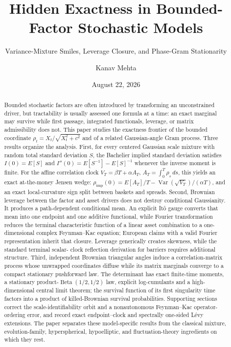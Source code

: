 \documentclass[
  english,
  11pt,
  letterpaper,
  DIV=11,
  numbers=noendperiod]{scrartcl}
\title{Hidden Exactness in Bounded-Factor Stochastic Models}
\subtitle{Variance-Mixture Smiles, Leverage Closure, and Phase-Gram
Stationarity}
\author{Kanav Mehta}
\date{August 22, 2026}
\theoremstyle{plain}
\theoremstyle{plain}
\theoremstyle{plain}
\theoremstyle{plain}
\theoremstyle{remark}
\begin{document}
\maketitle
\begin{abstract}
Bounded stochastic factors are often introduced by transforming an
unconstrained driver, but tractability is usually assessed one formula
at a time: an exact marginal may survive while first passage, integrated
functionals, leverage, or matrix admissibility does not. This paper
studies the exactness frontier of the bounded coordinate
\(\rho_t=X_t/\sqrt{X_t^2+c^2}\) and of a related Gaussian-angle Gram
process. Three results organize the analysis. First, for every centered
Gaussian scale mixture with random total standard deviation \(S\), the
Bachelier implied standard deviation satisfies \(I(0)=E[S]\) and
\(I''(0)=E[S^{-1}]-E[S]^{-1}\) whenever the inverse moment is finite.
For the affine correlation clock \(V_T=\beta T+\alpha A_T\),
\(A_T=\int_0^T\rho_s\,ds\), this yields an exact at-the-money Jensen
wedge: \(\rho_{\mathrm{imp}}(0)=E[A_T]/T-
\operatorname{Var}(\sqrt{V_T})/(\alpha T)\), and an exact
local-curvature sign split between baskets and spreads. Second, Brownian
leverage between the factor and asset drivers does not destroy
conditional Gaussianity. It produces a path-dependent conditional mean.
An explicit Itô gauge converts that mean into one endpoint and one
additive functional, while Fourier transformation reduces the terminal
characteristic function of a linear asset combination to a
one-dimensional complex Feynman--Kac equation; European claims with a
valid Fourier representation inherit that closure. Leverage generically
creates skewness, while the standard terminal scalar- clock reflection
derivation for barriers requires additional structure. Third,
independent Brownian triangular angles induce a correlation-matrix
process whose unwrapped coordinates diffuse while its matrix marginals
converge to a compact stationary pushforward law. The determinant has
exact finite-time moments, a stationary
product-\(\operatorname{Beta}(1/2,1/2)\) law, explicit log-cumulants and
a high-dimensional central limit theorem; the survival function of its
first singularity time factors into a product of killed-Brownian
survival probabilities. Supporting sections correct the
scale-identifiability orbit and a nonautonomous Feynman--Kac
operator-ordering error, and record exact endpoint--clock and spectrally
one-sided Lévy extensions. The paper separates these model-specific
results from the classical mixture, evolution-family, hyperspherical,
hypoelliptic, and fluctuation-theory ingredients on which they rest.
\end{abstract}
\end{document}
